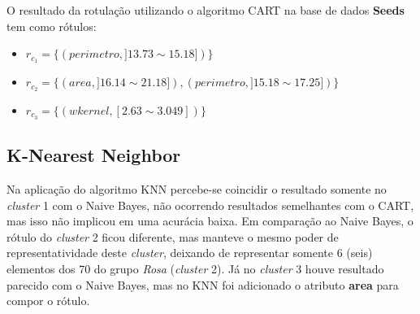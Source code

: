 %     

O resultado da rotulação utilizando o algoritmo CART na base de dados \textbf{Seeds} tem como rótulos: 
\begin{itemize}[noitemsep]
 \item ${r_{c_1}=\{ (perimetro, ]13.73 \sim 15.18]) \} }$
 \item ${r_{c_2}=\{ (area, ]16.14 \sim 21.18]), (perimetro, ]15.18 \sim 17.25]) \} }$
 \item ${r_{c_3}=\{ (wkernel, [2.63 \sim 3.049]) \} }$
\end{itemize}


\subsection{K-Nearest Neighbor} \label{cap:resultados:ssec:seed:knn}

Na aplicação do algoritmo KNN percebe-se coincidir o resultado somente no \textit{cluster} 1 com o Naive Bayes, não ocorrendo resultados semelhantes com o CART, mas isso não implicou em uma acurácia baixa. Em comparação ao Naive Bayes, o rótulo do \textit{cluster} 2 ficou diferente, mas manteve o mesmo poder de representatividade deste \textit{cluster}, deixando de representar somente 6 (seis) elementos dos 70 do grupo \textit{Rosa} (\textit{cluster} 2). Já no \textit{cluster} 3 houve resultado parecido com o Naive Bayes, mas no KNN foi adicionado o  atributo \textbf{area} para compor o rótulo.

